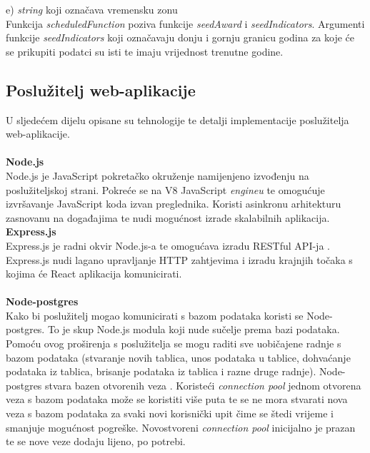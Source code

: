 \documentclass[times, utf8, zavrsni]{fer}
\begin{document}
    e) \emph{string} koji označava vremensku zonu
\\Funkcija \emph{scheduledFunction} poziva funkcije \emph{seedAward} i \emph{seedIndicators}. Argumenti funkcije \emph{seedIndicators}  
koji označavaju donju i gornju granicu godina za koje će se prikupiti podatci su isti te imaju vrijednost trenutne godine.
\\ \subsection{Poslužitelj web-aplikacije}
U sljedećem dijelu opisane su tehnologije te detalji implementacije poslužitelja web-aplikacije.
\\\\
\textbf{Node.js} 
\\ Node.js je JavaScript pokretačko okruženje  namijenjeno izvođenju na poslužiteljskoj strani. Pokreće se na V8 JavaScript \emph{engineu}
te omogućuje izvršavanje JavaScript koda izvan preglednika. Koristi asinkronu arhitekturu zasnovanu na događajima 
te nudi mogućnost izrade skalabilnih aplikacija. 
\\\textbf{Express.js}
\\ Express.js je radni okvir  Node.js-a te omogućava izradu RESTful API-ja . Express.js nudi
lagano upravljanje HTTP zahtjevima i izradu krajnjih točaka  s kojima će React aplikacija komunicirati.
\\ \\ \textbf{Node-postgres} 
\\ Kako bi poslužitelj mogao komunicirati s bazom podataka koristi se Node-postgres. To je skup Node.js modula koji nude 
sučelje prema bazi podataka. Pomoću ovog proširenja s poslužitelja se mogu raditi sve uobičajene radnje s bazom podataka (stvaranje novih tablica, 
unos podataka u tablice, dohvaćanje podataka iz tablica, brisanje podataka iz tablica i razne druge radnje).
Node-postgres stvara bazen otvorenih veza . Koristeći \emph{connection pool} jednom otvorena veza s bazom podataka može se koristiti više puta te se ne mora 
stvarati nova veza s bazom podataka za svaki novi korisnički upit čime se štedi vrijeme i smanjuje mogućnost pogreške. Novostvoreni \emph{connection pool} inicijalno 
je prazan te se nove veze dodaju lijeno, po potrebi.
\end{document}
